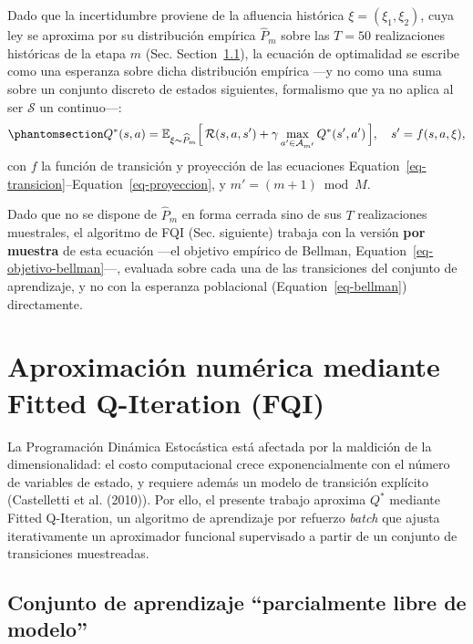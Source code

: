 \documentclass[
  letterpaper,
  DIV=11,
  numbers=noendperiod]{scrreprt}
\theoremstyle{definition}
\theoremstyle{remark}
\begin{document}
Dado que la incertidumbre proviene de la afluencia histórica
\(\xi=(\xi_1,\xi_2)\), cuya ley se aproxima por su distribución empírica
\(\widehat P_m\) sobre las \(T=50\) realizaciones históricas de la etapa
\(m\) (Sec. Section~\ref{sec-conjunto-aprendizaje}), la ecuación de
optimalidad se escribe como una esperanza sobre dicha distribución
empírica ---y no como una suma sobre un conjunto discreto de estados
siguientes, formalismo que ya no aplica al ser \(\mathcal S\) un
continuo---: \begin{equation}\protect\phantomsection\label{eq-bellman}{
Q^{*}(s,a) = \mathbb{E}_{\xi\sim\widehat P_m}\Big[\,\mathcal R(s,a,s') + \gamma\max_{a'\in\mathcal A_{m'}} Q^{*}(s',a')\,\Big], \quad s' = f(s,a,\xi),
}\end{equation} con \(f\) la función de transición y proyección de las
ecuaciones Equation~\ref{eq-transicion}--Equation~\ref{eq-proyeccion}, y
\(m'=(m+1)\bmod M\).

Dado que no se dispone de \(\widehat P_m\) en forma cerrada sino de sus
\(T\) realizaciones muestrales, el algoritmo de FQI (Sec. siguiente)
trabaja con la versión \textbf{por muestra} de esta ecuación ---el
objetivo empírico de Bellman, Equation~\ref{eq-objetivo-bellman}---,
evaluada sobre cada una de las transiciones del conjunto de aprendizaje,
y no con la esperanza poblacional (Equation~\ref{eq-bellman})
directamente.

\section{Aproximación numérica mediante Fitted Q-Iteration
(FQI)}\label{aproximaciuxf3n-numuxe9rica-mediante-fitted-q-iteration-fqi-1}

La Programación Dinámica Estocástica está afectada por la maldición de
la dimensionalidad: el costo computacional crece exponencialmente con el
número de variables de estado, y requiere además un modelo de transición
explícito (Castelletti et al. (2010)). Por ello, el presente trabajo
aproxima \(Q^*\) mediante Fitted Q-Iteration, un algoritmo de
aprendizaje por refuerzo \emph{batch} que ajusta iterativamente un
aproximador funcional supervisado a partir de un conjunto de
transiciones muestreadas.

\subsection{Conjunto de aprendizaje ``parcialmente libre de
modelo''}\label{sec-conjunto-aprendizaje}
\end{document}
